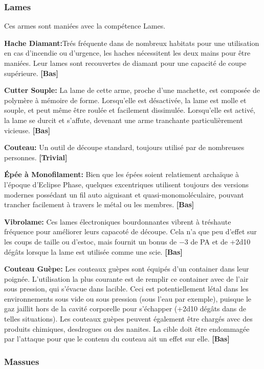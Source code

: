 \subsubsection{Lames} 

Ces armes sont maniées avec la compétence Lames. 

\textbf{Hache Diamant:}Trés fréquente dans de nombreux habitats pour une utilisation en cas d'incendie ou d'urgence, les haches nécessitent les deux mains pour être maniées. Leur lames sont recouvertes de diamant pour une capacité de coupe supérieure. \textbf{[Bas]} 

\textbf{Cutter Souple:} La lame de cette arme, proche d'une machette, est composée de polymère à mémoire de forme. Lorsqu'elle est désactivée, la lame est molle et souple, et peut même être roulée et facilement dissimulée. Lorsqu'elle est activé, la lame se durcit et s'affute, devenant une arme tranchante particulièrement vicieuse. \textbf{[Bas]} 

\textbf{Couteau:} Un outil de découpe standard, toujours utilisé par de nombreuses personnes. \textbf{[Trivial]} 

\textbf{Épée à Monofilament:} Bien que les épées soient relatiement archaïque à l'époque d'Eclipse Phase, quelques excentriques utilisent toujours des versions modernes possédant un fil auto aiguisant et quasi-monomoléculaire, pouvant trancher facilement à travers le métal ou les membres. \textbf{[Bas]} 

\textbf{Vibrolame:} Ces lames électroniques bourdonnantes vibrent à tréshaute fréquence pour améliorer leurs capacoté de découpe. Cela n'a que peu d'effet sur les coups de taille ou d'estoc, mais fournit un bonus de $-$3 de PA et de +2d10 dégâts lorsque la lame est utilisée comme une scie. \textbf{[Bas]} 

\textbf{Couteau Guèpe:} Les couteaux guèpes sont équipés d'un container dans leur poignée. L'utilisation la plus courante est de remplir ce container avec de l'air sous pression, qui s'évacue dans lacible. Ceci est potentiellement létal dans les environnements sous vide ou sous pression (sous l'eau par exemple), puisque le gaz jaillit hors de la cavité corporelle pour s'échapper (+2d10 dégâts dans de telles situations). Les couteaux guèpes peuvent également être chargés avec des produits chimiques, desdrogues ou des nanites. La cible doit être endommagée par l'attaque pour que le contenu du couteau ait un effet sur elle. \textbf{[Bas]} 

\subsubsection{Massues} 


